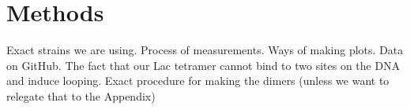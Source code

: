 \section*{Methods}

Exact strains we are using. Process of measurements. Ways of making plots. Data on GitHub. The fact that our Lac tetramer cannot bind to two sites on the DNA and induce looping. Exact procedure for making the dimers (unless we want to relegate that to the Appendix)